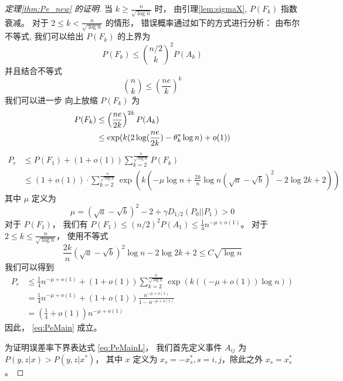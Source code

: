 \begin{proof}[定理\ref{thm:Pe_new} 的证明]
当 $k \geq \frac{n}{\sqrt{\log n}}$ 时，
由引理\ref{lem:sigmaX},
$P(F_k)$ 指数衰减。
对于 $2\leq k < \frac{n}{\sqrt{\log n}}$
的情形，
错误概率通过如下的方式进行分析：
由布尔不等式,
我们可以给出 $P(F_k)$ 的上界为
\begin{equation}\label{eq:FAk}
P(F_k) \leq \binom{n/2}{k}^2 P(A_k)
\end{equation}
并且结合不等式
\begin{equation}\label{eq:nk_binom_small}
    \binom{n}{k} \leq (\frac{ne}{k})^k
\end{equation}
我们可以进一步 向上放缩 $P(F_k)$ 为
\begin{align}
P(F_k) & \leq \left(\frac{ne}{2k}\right)^{2k} P(A_k) 
\label{eq:P_F_k_less_A_k}\\
&\leq \exp(k(2\log(\frac{ne}{2k})-\theta_k^* \log n) + o(1))
\notag
\end{align}
\begin{align*}
P_e &\leq P(F_1)+(1+o(1))\sum_{k=2}^{\frac{n}{\sqrt{\log n}}} P(F_k) \\
& \leq (1+o(1))\cdot \sum_{k=2}^{\frac{n}{\sqrt{\log n}}}
\exp\left(k(-\mu \log n + \frac{2k}{n} \log n(\sqrt{a} - \sqrt{b})^2 - 2\log 2k + 2)
\right)
\end{align*}
其中 $\mu$ 定义为
\begin{equation}\label{eq:mu_def}
	\mu = (\sqrt{a} - \sqrt{b})^2-2 + \gamma D_{1/2}(P_0||P_1) > 0	
\end{equation}
对于 $P(F_1)$， 我们有 $P(F_1)\leq (n/2)^2
P(A_1)\leq \frac{1}{4}n^{-\mu+o(1)}$。
对于 $2\leq k \leq \frac{n}{\sqrt{\log n}}$，
使用不等式
$$
\frac{2k}{n}(\sqrt{a} - \sqrt{b})^2\log n -2\log2k+2\leq  C\sqrt{\log n}
$$
我们可以得到
\begin{align*}
P_e &\leq \frac{1}{4}n^{-\mu + o(1)} +(1+o(1)) \sum_{k=2}^{\frac{n}{\sqrt{\log n}}} \exp(k((-\mu + o(1)) \log n )) \\
& =\frac{1}{4}n^{-\mu + o(1)}+(1+o(1)) \frac{n^{-\mu + o(1)}}{1-n^{-\mu + o(1)}} \\
&= (\frac{1}{4}+o(1))n^{-\mu + o(1)}
\end{align*}
因此， \eqref{eq:PeMain} 成立。

为证明误差率下界表达式
\eqref{eq:PeMainL}，
我们首先定义事件 $A_{ij}$ 为
$P(y,z|x) > P(y,z|x^*)$，
其中 $x$ 定义为
$x_s=-x^*_s,
s=i,j$，除此之外
$x_s=x^*_s$
。


\end{proof}
